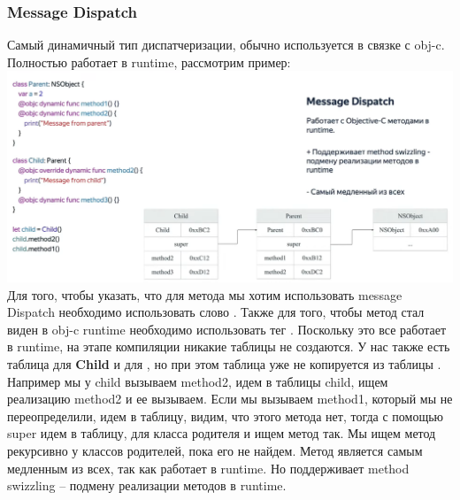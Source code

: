\documentclass{article}
\begin{document}
    \subsubsection{Message Dispatch}
    Самый динамичный тип диспатчеризации, обычно используется в связке с obj-c. Полностью работает в runtime, рассмотрим пример: 
    \newline
    \includegraphics[scale = 0.2]{pic/Снимок экрана 2023-07-28 в 19.33.48.png}
    \newline
    Для того, чтобы указать, что для метода мы хотим использовать message Dispatch необходимо использовать слово . Также для того, чтобы метод стал виден в obj-c runtime необходимо использовать тег .
    \newline
    Поскольку это все работает в runtime, на этапе компиляции никакие таблицы не создаются. У нас также есть таблица для \textbf{Child} и для , но при этом таблица  уже не копируется из таблицы . 
    \newline
    Например мы у child вызываем method2, идем в таблицы child, ищем реализацию method2 и ее вызываем. Если мы вызываем method1, который мы не переопределили, идем в таблицу, видим, что этого метода нет, тогда с помощью super идем в таблицу, для класса родителя и ищем метод так. Мы ищем метод рекурсивно у классов родителей, пока его не найдем. 
    \newline
    Метод является самым медленным из всех, так как работает в runtime. Но поддерживает method swizzling -- подмену реализации методов в runtime. 
\end{document}
